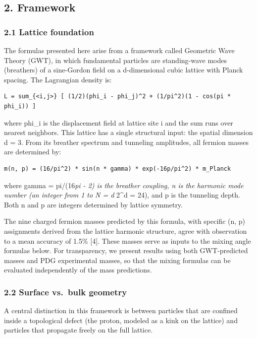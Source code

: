 \documentclass[
]{article}
\begin{document}
\subsection{2. Framework}\label{framework}

\subsubsection{2.1 Lattice foundation}\label{lattice-foundation}

The formulas presented here arise from a framework called Geometric Wave
Theory (GWT), in which fundamental particles are standing-wave modes
(breathers) of a sine-Gordon field on a d-dimensional cubic lattice with
Planck spacing. The Lagrangian density is:

\begin{verbatim}
L = sum_{<i,j>} [ (1/2)(phi_i - phi_j)^2 + (1/pi^2)(1 - cos(pi * phi_i)) ]
\end{verbatim}

where phi\_i is the displacement field at lattice site i and the sum
runs over nearest neighbors. This lattice has a single structural input:
the spatial dimension d = 3. From its breather spectrum and tunneling
amplitudes, all fermion masses are determined by:

\begin{verbatim}
m(n, p) = (16/pi^2) * sin(n * gamma) * exp(-16p/pi^2) * m_Planck
\end{verbatim}

where gamma = pi/(16\emph{pi - 2) is the breather coupling, n is the
harmonic mode number (an integer from 1 to N = d } 2\^{}d = 24), and p
is the tunneling depth. Both n and p are integers determined by lattice
symmetry.

The nine charged fermion masses predicted by this formula, with specific
(n, p) assignments derived from the lattice harmonic structure, agree
with observation to a mean accuracy of 1.5\% {[}4{]}. These masses serve
as inputs to the mixing angle formulas below. For transparency, we
present results using both GWT-predicted masses and PDG experimental
masses, so that the mixing formulas can be evaluated independently of
the mass predictions.

\subsubsection{2.2 Surface vs.~bulk
geometry}\label{surface-vs.-bulk-geometry}

A central distinction in this framework is between particles that are
confined inside a topological defect (the proton, modeled as a kink on
the lattice) and particles that propagate freely on the full lattice.
\end{document}
